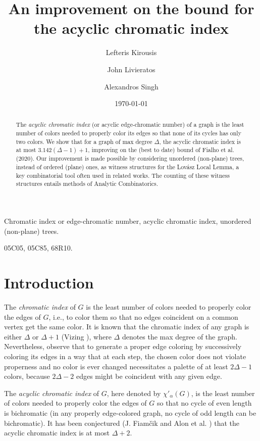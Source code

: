 \documentclass{amsart}
\date{\today}
\title[Acyclic chromatic index]{An improvement on the bound for the acyclic chromatic index%
}
\author{Lefteris Kirousis \orcidlink{0000-0002-4912-8959}}\thanks{Corresponding author: L. Kirousis.}
\author{John Livieratos \orcidlink{0000-0001-6409-4286}}
\author{Alexandros Singh \orcidlink{0000-0002-6263-950X}}
\theoremstyle{plain}
\begin{document}
\maketitle




\begin{abstract}
 The {\em acyclic chromatic index} (or acyclic edge-chromatic number) of a graph
is the least number of colors needed to properly color its edges so that none
of its cycles has only two colors. We show that for a graph of max degree
$\Delta$, the acyclic chromatic index is at most $3.142(\Delta-1)+1$,
improving on the (best to date) bound of Fialho et al. (2020).
Our improvement is made possible by considering unordered
(non-plane) trees, instead of ordered (plane) ones, as witness structures for
the Lov\'{a}sz Local Lemma, a key combinatorial tool often used in related
works. The counting of these witness structures entails methods of Analytic Combinatorics.
\end{abstract}

  Chromatic index or edge-chromatic number, acyclic chromatic index, unordered (non-plane) trees.

 05C05, 05C85, 68R10.


\section{Introduction}\label{sec:intro}


The  {\em chromatic index} of $G$ is the least number of colors needed to properly color the edges of $G$, i.e., to color them so that no edges coincident on a common vertex get the same color.  It is known that the chromatic index of any graph is either $\Delta$ or $\Delta+1$ (Vizing \cite{vizing1965critical}), where $\Delta$ denotes the max degree of the graph. Nevertheless, observe that to generate a proper edge coloring by successively coloring its edges in a way that at each step, the chosen color does not violate properness and no color is ever changed necessitates a palette of at least $2\Delta -1$ colors, because $2\Delta -2 $ edges might be coincident with any given edge. 

The {\em acyclic chromatic index} of $G$, here denoted by $\chi'_{\alpha}(G)$,   is the least number of colors needed to properly color the edges of $G$ so that no cycle of even length is bichromatic (in any properly edge-colored graph, no cycle of odd length can be bichromatic).  It has been conjectured (J. Fiam\v{c}ik \cite{fiam} and Alon et al. \cite{alon2001acyclic}) that the acyclic chromatic index is at most  $\Delta +2$. 
 
\end{document}
